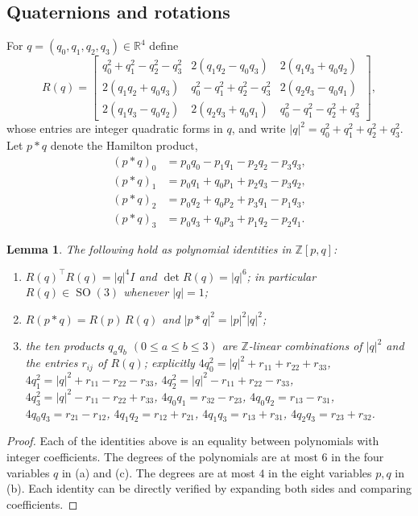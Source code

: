 \documentclass[reqno]{amsart}
\newtheorem{lemma}[theorem]{Lemma}
\theoremstyle{definition}
\DeclareMathOperator{\SO}{SO}
\newcommand{\R}{\mathbb{R}}
\newcommand{\Z}{\mathbb{Z}}
\begin{document}
\subsection{Quaternions and rotations}\label{subs:quaternionsBasic}
For $q=(q_0,q_1,q_2,q_3)\in\R^4$ define
\[
R(q)=\left[\begin{array}{ccc}
q_0^2+q_1^2-q_2^2-q_3^2 & 2(q_1q_2-q_0q_3) & 2(q_1q_3+q_0q_2)\\
2(q_1q_2+q_0q_3) & q_0^2-q_1^2+q_2^2-q_3^2 & 2(q_2q_3-q_0q_1)\\
2(q_1q_3-q_0q_2) & 2(q_2q_3+q_0q_1) & q_0^2-q_1^2-q_2^2+q_3^2
\end{array}\right],
\]
whose entries are integer quadratic forms in $q$, and write
$|q|^2=q_0^2+q_1^2+q_2^2+q_3^2$. Let $p*q$ denote the Hamilton product,
\begin{align*}
(p*q)_0&= p_0q_0-p_1q_1-p_2q_2-p_3q_3,\\
(p*q)_1&=p_0q_1+q_0p_1+p_2q_3-p_3q_2,\\
(p*q)_2&=p_0q_2+q_0p_2+p_3q_1-p_1q_3,\\
(p*q)_3&=p_0q_3+q_0p_3+p_1q_2-p_2q_1.
\end{align*}

\begin{lemma}\label{lem:quat}
The following hold as polynomial identities in $\Z[p,q]$:
\begin{enumerate}[leftmargin=2.2em,label=(\alph*)]
\item $R(q)^\top R(q)=|q|^4 I$ and $\det R(q)=|q|^6$; in particular $R(q)\in\SO(3)$ whenever
$|q|=1$;
\item $R(p*q)=R(p)\,R(q)$ and $|p*q|^2=|p|^2|q|^2$;
\item the ten products $q_aq_b$ $(0\le a\le b\le3)$ are $\Z$-linear combinations of $|q|^2$ and the
entries $r_{ij}$ of $R(q)$; explicitly
$4q_0^2=|q|^2+r_{11}+r_{22}+r_{33}$, $4q_1^2=|q|^2+r_{11}-r_{22}-r_{33}$,
$4q_2^2=|q|^2-r_{11}+r_{22}-r_{33}$, $4q_3^2=|q|^2-r_{11}-r_{22}+r_{33}$,
$4q_0q_1=r_{32}-r_{23}$, $4q_0q_2=r_{13}-r_{31}$, $4q_0q_3=r_{21}-r_{12}$,
$4q_1q_2=r_{12}+r_{21}$, $4q_1q_3=r_{13}+r_{31}$, $4q_2q_3=r_{23}+r_{32}$.
\end{enumerate}
\end{lemma}
\begin{proof}
Each of the identities above is an equality between polynomials with integer coefficients. The degrees of the polynomials 
are at most $6$ in the
four variables $q$ in (a) and (c). The degrees are at most $4$ in the eight variables $p,q$ in (b).
Each identity can be directly verified by expanding both sides and comparing coefficients.
\end{proof}
\end{document}
